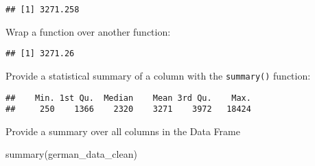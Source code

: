 \documentclass[
]{article}
\newenvironment{Shaded}{\begin{snugshade}}{\end{snugshade}}
\newcommand{\DecValTok}[1]{\textcolor[rgb]{0.00,0.00,0.81}{#1}}
\newcommand{\FunctionTok}[1]{\textcolor[rgb]{0.00,0.00,0.00}{#1}}
\newcommand{\NormalTok}[1]{#1}
\newcommand{\SpecialCharTok}[1]{\textcolor[rgb]{0.00,0.00,0.00}{#1}}
\begin{document}
\begin{verbatim}
## [1] 3271.258
\end{verbatim}

Wrap a function over another function:

\begin{Shaded}
\end{Shaded}

\begin{verbatim}
## [1] 3271.26
\end{verbatim}

Provide a statistical summary of a column with the \texttt{summary()}
function:

\begin{Shaded}
\end{Shaded}

\begin{verbatim}
##    Min. 1st Qu.  Median    Mean 3rd Qu.    Max. 
##     250    1366    2320    3271    3972   18424
\end{verbatim}

Provide a summary over all columns in the Data Frame

\begin{Shaded}
\begin{Highlighting}[]
\FunctionTok{summary}\NormalTok{(german\_data\_clean)}
\end{Highlighting}
\end{Shaded}
\end{document}
